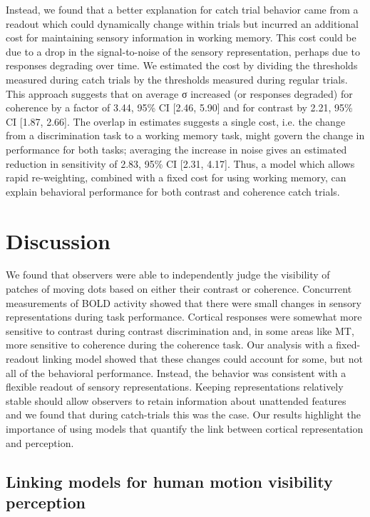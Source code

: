 \documentclass{report}
\begin{document}
Instead, we found that a better explanation for catch trial behavior came from a readout which could dynamically change within trials but incurred an additional cost for maintaining sensory information in working memory. This cost could be due to a drop in the signal-to-noise of the sensory representation, perhaps due to responses degrading over time. We estimated the cost by dividing the thresholds measured during catch trials by the thresholds measured during regular trials. This approach suggests that on average σ increased (or responses degraded) for coherence by a factor of 3.44, 95\% CI [2.46, 5.90] and for contrast by 2.21, 95\% CI [1.87, 2.66]. The overlap in estimates suggests a single cost, i.e. the change from a discrimination task to a working memory task, might govern the change in performance for both tasks; averaging the increase in noise gives an estimated reduction in sensitivity of 2.83, 95\% CI [2.31, 4.17]. Thus, a model which allows rapid re-weighting, combined with a fixed cost for using working memory, can explain behavioral performance for both contrast and coherence catch trials.

\section{Discussion}

We found that observers were able to independently judge the visibility of patches of moving dots based on either their contrast or coherence. Concurrent measurements of BOLD activity showed that there were small changes in sensory representations during task performance. Cortical responses were somewhat more sensitive to contrast during contrast discrimination and, in some areas like MT, more sensitive to coherence during the coherence task. Our analysis with a fixed-readout linking model showed that these changes could account for some, but not all of the behavioral performance. Instead, the behavior was consistent with a flexible readout of sensory representations. Keeping representations relatively stable should allow observers to retain information about unattended features and we found that during catch-trials this was the case. Our results highlight the importance of using models that quantify the link between cortical representation and perception.

\subsection{Linking models for human motion visibility perception}
\end{document}
